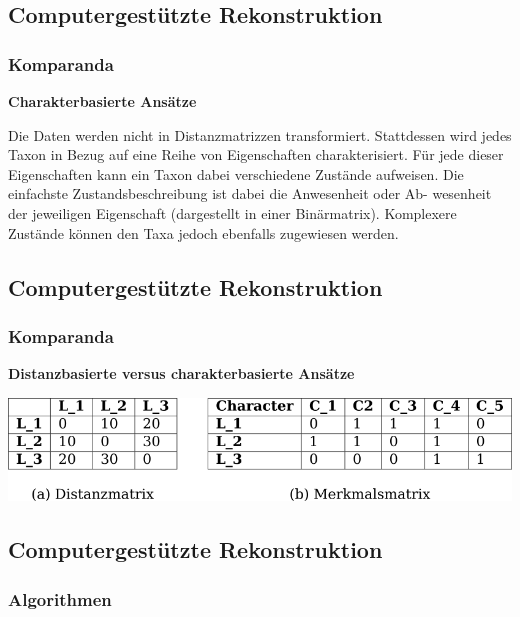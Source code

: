 \subsection{\texorpdfstring{{Computergestützte
Rekonstruktion}}{Computergestützte Rekonstruktion}}

\subsubsection{\texorpdfstring{{Komparanda}}{Komparanda}}

\textbf{Charakterbasierte Ansätze}

Die Daten werden nicht in Distanzmatrizzen transformiert. Stattdessen
wird jedes Taxon in Bezug auf eine Reihe von Eigenschaften
charakterisiert. Für jede dieser Eigenschaften kann ein Taxon dabei
verschiedene Zustände aufweisen. Die einfachste Zustandsbeschreibung ist
dabei die Anwesenheit oder Ab- wesenheit der jeweiligen Eigenschaft
(dargestellt in einer Binärmatrix). Komplexere Zustände können den Taxa
jedoch ebenfalls zugewiesen werden.

\subsection{\texorpdfstring{{Computergestützte
Rekonstruktion}}{Computergestützte Rekonstruktion}}

\subsubsection{\texorpdfstring{{Komparanda}}{Komparanda}}

\textbf{Distanzbasierte versus charakterbasierte Ansätze}

\href{img/perspective.png}{\includegraphics{img/perspective.png}}

\subsection{\texorpdfstring{{Computergestützte
Rekonstruktion}}{Computergestützte Rekonstruktion}}

\subsubsection{\texorpdfstring{{Algorithmen}}{Algorithmen}}

